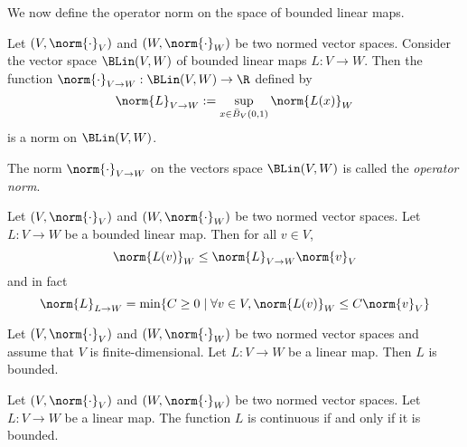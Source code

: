 We now define the operator norm on the space of bounded linear maps.
\begin{proposition}
    Let $(V,\norm{\cdot}_V)$ and $(W,\norm{\cdot}_W)$ be two normed vector spaces. Consider the vector space $\BLin(V,W)$
    of bounded linear maps $L: V \to W$. Then the function $\norm{\cdot}_{V\to W}: \BLin(V,W) \to \R$ defined by
    $$\norm{L}_{V \to W} := \sup_{x \in \bar{B}_V(0,1)} \norm{L(x)}_W$$
    is a norm on $\BLin(V,W)$.
\end{proposition}
\begin{definition}
    The norm $\norm{\cdot}_{V \to W}$ on the vectors space $\BLin(V,W)$ is called the \emph{operator norm}.
\end{definition}
\begin{proposition}
    Let $(V,\norm{\cdot}_V)$ and $(W,\norm{\cdot}_W)$ be two normed vector spaces. Let $L: V \to W$ be a bounded linear map.
    Then for all $v \in V$,
    $$\norm{L(v)}_W \le \norm{L}_{V \to W}\norm{v}_V$$
    and in fact
    $$\norm{L}_{L \to W} = \min\{C \ge 0 \mid \forall v \in V, \norm{L(v)}_W \le C\norm{v}_V\}$$
\end{proposition}

\begin{theorem}
    Let $(V,\norm{\cdot}_V)$ and $(W,\norm{\cdot}_W)$ be two normed vector spaces and assume that $V$ is finite-dimensional. Let $L: V \to W$ be a linear map.
    Then $L$ is bounded.
\end{theorem}

\begin{theorem}
    Let $(V,\norm{\cdot}_V)$ and $(W,\norm{\cdot}_W)$ be two normed vector spaces. Let $L: V \to W$ be a linear map.
    The function $L$ is continuous if and only if it is bounded.
\end{theorem}
